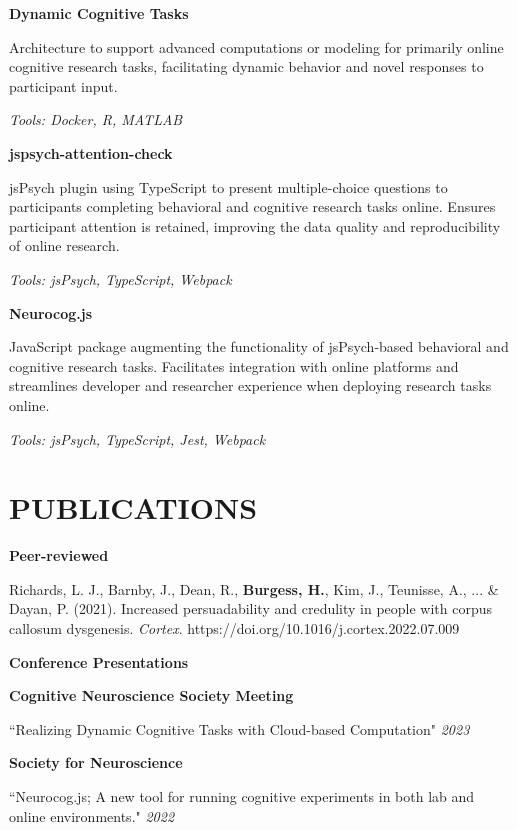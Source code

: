 \documentclass{article}
\begin{document}
  \textbf{Dynamic Cognitive Tasks}

  Architecture to support advanced computations or modeling for primarily online cognitive research tasks, facilitating dynamic behavior and novel responses to participant input.

  \textit{Tools: Docker, R, MATLAB}

  \medbreak

  \textbf{jspsych-attention-check}

  jsPsych plugin using TypeScript to present multiple-choice questions to participants completing behavioral and cognitive research tasks online. Ensures participant attention is retained, improving the data quality and reproducibility of online research.

  \textit{Tools: jsPsych, TypeScript, Webpack}

  \medbreak

  \textbf{Neurocog.js}

  JavaScript package augmenting the functionality of jsPsych-based behavioral and cognitive research tasks. Facilitates integration with online platforms and streamlines developer and researcher experience when deploying research tasks online.

  \textit{Tools: jsPsych, TypeScript, Jest, Webpack}

  \section*{\centering\uppercase{Publications}}

  {\large\textbf{Peer-reviewed}}

  Richards, L. J., Barnby, J., Dean, R., \textbf{Burgess, H.}, Kim, J., Teunisse, A., ... \& Dayan, P. (2021). Increased persuadability and credulity in people with corpus callosum dysgenesis. \textit{Cortex}.
  https://doi.org/10.1016/j.cortex.2022.07.009

  \medbreak

  {\large\textbf{Conference Presentations}}

  \textbf{Cognitive Neuroscience Society Meeting}

  ``Realizing Dynamic Cognitive Tasks with Cloud-based Computation" \hfill \textit{2023}

  \medbreak

  \textbf{Society for Neuroscience}

  ``Neurocog.js; A new tool for running cognitive experiments in both lab and online environments." \hfill \textit{2022}
\end{document}

